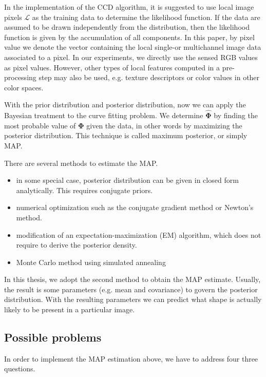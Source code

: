 In the implementation of the CCD algorithm, it is suggested to use local image pixels $\mathcal{L}$ as the training data to
determine the likelihood function. If the data are assumed to be drawn
 independently from the distribution, then the likelihood function is
given by the accumulation of all components.
In this paper, by pixel value we denote the vector containing the local single-or multichannel
image data associated to a pixel. In our experiments, we directly use the sensed RGB
values as pixel values. However, other types of local features computed in a pre-processing
step may also be used, e.g. texture descriptors or color values in
other color spaces.

With the prior distribution and posterior distribution, now we can
apply the Bayesian treatment to the curve fitting problem.
We determine $\hat{\mathbf{\Phi}}$ by finding the most probable
value of $\mathbf{\Phi}$ given the data, in other words by maximizing
the posterior distribution. This technique is called maximum
posterior, or simply MAP.

There are several methods to estimate the MAP.
\begin{itemize}
\item in some special case, posterior distribution can be given in
  closed form analytically. This requires conjugate priors.
\item numerical optimization such as the conjugate gradient method or
  Newton's method.
\item modification of an expectation-maximization (EM) algorithm,
  which does not require to derive the posterior density.
\item Monte Carlo method using simulated annealing
\end{itemize}

In this thesis, we adopt the second method to obtain the MAP estimate.
Usually, the result is some parameters (e.g. mean and covariance) to
govern the posterior distribution. With the resulting parameters we
can predict what shape is actually likely to be present in a particular image.


\subsection{Possible problems}
\label{sec:prob}
In order to implement the MAP estimation above, we have to address
four three questions.

